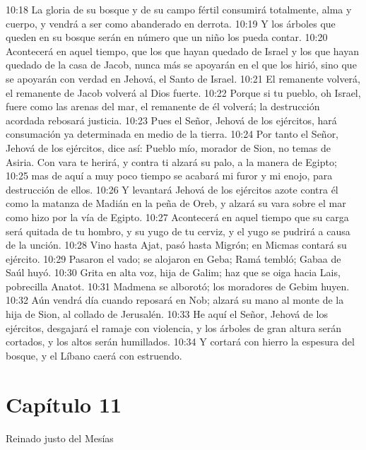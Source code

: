 10:18 La gloria de su bosque y de su campo fértil consumirá totalmente, alma y cuerpo, y vendrá a ser como abanderado en derrota. 
10:19 Y los árboles que queden en su bosque serán en número que un niño los pueda contar. 
10:20 Acontecerá en aquel tiempo, que los que hayan quedado de Israel y los que hayan quedado de la casa de Jacob, nunca más se apoyarán en el que los hirió, sino que se apoyarán con verdad en Jehová, el Santo de Israel. 
10:21 El remanente volverá, el remanente de Jacob volverá al Dios fuerte. 
10:22 Porque si tu pueblo, oh Israel, fuere como las arenas del mar, el remanente de él volverá; la destrucción acordada rebosará justicia. 
10:23 Pues el Señor, Jehová de los ejércitos, hará consumación ya determinada en medio de la tierra. 
10:24 Por tanto el Señor, Jehová de los ejércitos, dice así: Pueblo mío, morador de Sion, no temas de Asiria. Con vara te herirá, y contra ti alzará su palo, a la manera de Egipto; 
10:25 mas de aquí a muy poco tiempo se acabará mi furor y mi enojo, para destrucción de ellos. 
10:26 Y levantará Jehová de los ejércitos azote contra él como la matanza de Madián en la peña de Oreb, y alzará su vara sobre el mar como hizo por la vía de Egipto. 
10:27 Acontecerá en aquel tiempo que su carga será quitada de tu hombro, y su yugo de tu cerviz, y el yugo se pudrirá a causa de la unción. 
10:28 Vino hasta Ajat, pasó hasta Migrón; en Micmas contará su ejército. 
10:29 Pasaron el vado; se alojaron en Geba; Ramá tembló; Gabaa de Saúl huyó. 
10:30 Grita en alta voz, hija de Galim; haz que se oiga hacia Lais, pobrecilla Anatot. 
10:31 Madmena se alborotó; los moradores de Gebim huyen. 
10:32 Aún vendrá día cuando reposará en Nob; alzará su mano al monte de la hija de Sion, al collado de Jerusalén. 
10:33 He aquí el Señor, Jehová de los ejércitos, desgajará el ramaje con violencia, y los árboles de gran altura serán cortados, y los altos serán humillados. 
10:34 Y cortará con hierro la espesura del bosque, y el Líbano caerá con estruendo. 
\section*{Capítulo 11 }
Reinado justo del Mesías 
 
